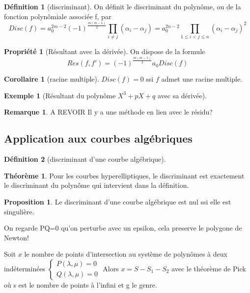 \documentclass{article}
\theoremstyle{definition} %
\newtheorem{defi}{Définition}
\newtheorem{rmq}{Remarque}
\newtheorem{thm}{Théorème}
\newtheorem{prop}{Proposition}
\newtheorem{ex}{Exemple}
\newtheorem{propri}{Propriété}
\newtheorem{cor}{Corollaire}
\newcommand{\1}{\mathbb{1}} %
\begin{document}
\begin{defi}[discriminant]

On définit le discriminant du polynôme, ou de la fonction polynômiale associée f, par
$$Disc(f)=a_0^{2m-2} (-1)^{\frac{m(m-1)}{2}} \prod_{i \neq j} (\alpha_i - \alpha_j) = a_0^{2n-2} \prod_{1 \leq i < j \leq n} (\alpha_i - \alpha_j)^2$$
\end{defi}

\begin{propri}[Résultant avec la dérivée]
On dispose de la formule
$$Res(f,f')=(-1)^{\frac{m(m-1)}{2}} a_0 Disc(f)$$
\end{propri}

\begin{cor}[racine multiple]
$Disc(f)=0$ ssi $f$ admet une racine multiple.
\end{cor}

\begin{ex}[Résultant du polynôme $X^3 + pX + q$ avec sa dérivée]

\end{ex}

\begin{rmq}
A REVOIR Il y a une méthode en lien avec le résidu?
\end{rmq}

\subsection{Application aux courbes algébriques}

\begin{defi}[discriminant d'une courbe algébrique]

\end{defi}



\begin{thm}
Pour les courbes hyperelliptiques, le discriminant est exactement le discriminant du polynôme qui intervient dans la définition.
\end{thm}

\begin{prop}
Le discriminant d'une courbe algébrique est nul ssi elle est singulière.
\end{prop}


On regarde PQ=0 qu'on perturbe avec un epsilon, cela preserve le polygone de Newton!


\begin{tcolorbox}[colback=blue!5!white,colframe=blue!75!black,title=Théorème de Koushirenko-Bernstein]
    Soit $x$ le nombre de points d'intersection au système de polynômes à deux indéterminées
    $\begin{cases}
       P(\lambda,\mu)=0 \\
        Q(\lambda,\mu)=0
    \end{cases}$
    Alors 
    $x=S - S_1 - S_2$
    avec le théorème de Pick où s est le nombre de points à l'infini et g le genre.
\end{tcolorbox}
\end{document}
